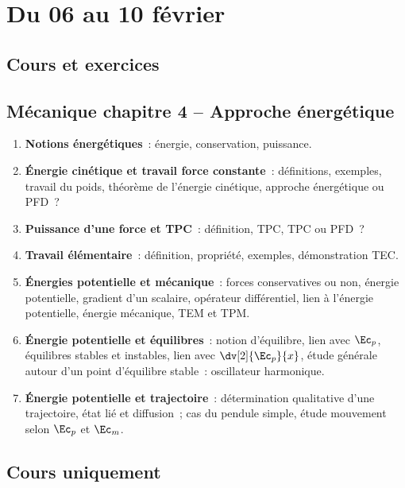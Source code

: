 \documentclass[a4paper, 12pt, final, garamond]{book}
\begin{document}
\setcounter{chapter}{17}

\chapter{Du 06 au 10 f\'evrier}

\section{Cours et exercices}
\section*{Mécanique chapitre 4 -- Approche énergétique}
\begin{enumerate}[label=\Roman*]
    \item \textbf{Notions énergétiques}~: énergie, conservation, puissance.
    \item \textbf{Énergie cinétique et travail force constante}~: définitions,
        exemples, travail du poids, théorème de l'énergie cinétique, approche
        énergétique ou PFD~?
    \item \textbf{Puissance d'une force et TPC}~: définition, TPC, TPC ou PFD~?
    \item \textbf{Travail élémentaire}~: définition, propriété, exemples,
        démonstration TEC.
    \item \textbf{Énergies potentielle et mécanique}~: forces conservatives ou
        non, énergie potentielle, gradient d'un scalaire, opérateur
        différentiel, lien à l'énergie potentielle, énergie mécanique, TEM et
        TPM.
    \item \textbf{Énergie potentielle et équilibres}~: notion d'équilibre, lien
        avec $\Ec_p$, équilibres stables et instables, lien avec
        $\dv[2]{\Ec_p}{x}$, étude générale autour d'un point d'équilibre
        stable~: oscillateur harmonique.
    \item \textbf{Énergie potentielle et trajectoire}~: détermination
        qualitative d'une trajectoire, état lié et diffusion~; cas du pendule
        simple, étude mouvement selon $\Ec_p$ et $\Ec_m$.
\end{enumerate}

\section{Cours uniquement}
\end{document}
